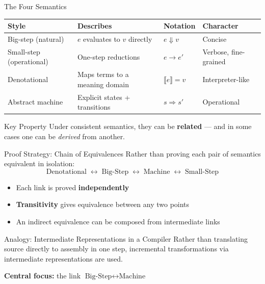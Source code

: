 \documentclass[10pt,compress,aspectratio=169]{beamer}
\begin{document}
\begin{frame}{The Four Semantics}
  \begin{center}
  \begin{tabular}{llll}
    \toprule
    \textbf{Style} & \textbf{Describes} & \textbf{Notation} & \textbf{Character} \\
    \midrule
    Big-step (natural)       & $e$ evaluates to $v$ directly    & $e \Downarrow v$              & Concise \\[4pt]
    Small-step (operational) & One-step reductions               & $e \longrightarrow e'$        & Verbose, fine-grained \\[4pt]
    Denotational             & Maps terms to a meaning domain   & $\llbracket e \rrbracket = v$ & Interpreter-like \\[4pt]
    Abstract machine         & Explicit states + transitions    & $s \Rightarrow s'$            & Operational \\
    \bottomrule
  \end{tabular}
  \end{center}
  \bigskip
  \begin{block}{Key Property}
    Under consistent semantics, they can be \textbf{related} --- and in some cases one can be \emph{derived} from another.
  \end{block}
\end{frame}

\begin{frame}{Proof Strategy: Chain of Equivalences}
  Rather than proving each pair of semantics equivalent in isolation:
  \[
    \text{Denotational}
    \;\longleftrightarrow\;
    \text{Big-Step}
    \;\longleftrightarrow\;
    \text{Machine}
    \;\longleftrightarrow\;
    \text{Small-Step}
  \]
  \begin{itemize}
    \item Each link is proved \textbf{independently}
    \item \textbf{Transitivity} gives equivalence between any two points
    \item An indirect equivalence can be composed from intermediate links
  \end{itemize}
  \bigskip
  \begin{block}{Analogy: Intermediate Representations in a Compiler}
    Rather than translating source directly to assembly in one step,
    incremental transformations via intermediate representations are used.
  \end{block}
  \bigskip
  {\small\textbf{Central focus:} the link $\text{Big-Step} \longleftrightarrow \text{Machine}$}
\end{frame}
\end{document}
